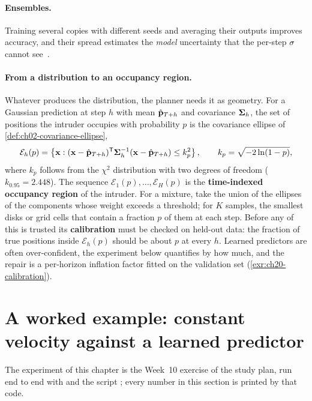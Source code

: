\paragraph{Ensembles.}%
Training several copies with different seeds and averaging their outputs
improves accuracy, and their spread estimates the \emph{model} uncertainty
that the per-step $\mathbf{\sigma}$ cannot
see~\cite{lakshminarayanan2017ensembles}.

\paragraph{From a distribution to an occupancy region.}
%
Whatever produces the distribution, the planner needs it as geometry. For a
Gaussian prediction at step $h$ with mean $\hat{\mathbf{p}}_{T+h}$ and covariance
$\mathbf{\Sigma}_h$, the set of positions the intruder occupies with probability
$p$ is the covariance ellipse of \cref{def:ch02-covariance-ellipse},
\begin{equation}
  \mathcal{E}_h(p) = \left\{ \mathbf{x} : (\mathbf{x} - \hat{\mathbf{p}}_{T+h})^{\mathsf{T}}\mathbf{\Sigma}_h^{-1}(\mathbf{x} - \hat{\mathbf{p}}_{T+h}) \le k_p^2 \right\},
  \qquad k_p = \sqrt{-2\ln(1 - p)},
  \label{eq:ch20-ellipse}
\end{equation}
where $k_p$ follows from the $\chi^2$ distribution with two degrees of
freedom ($k_{0.95} = 2.448$). The sequence $\mathcal{E}_1(p), \dots,
\mathcal{E}_H(p)$ is the \textbf{time-indexed occupancy region} of the
intruder. For a mixture, take the union of the ellipses of the components
whose weight exceeds a threshold; for $K$ samples, the smallest disks or grid
cells that contain a fraction $p$ of them at each step. Before any of this is
trusted its \textbf{calibration} must be checked on
held-out data: the fraction of true positions inside $\mathcal{E}_h(p)$ should
be about $p$ at every $h$. Learned predictors are often over-confident, the
experiment below quantifies by how much, and the repair is a per-horizon
inflation factor fitted on the validation set
(\cref{exr:ch20-calibration}).

\section[A worked example]{A worked example: constant velocity against a learned predictor}
\label{sec:ch20-example}

The experiment of this chapter is the Week~10 exercise of the study plan,
run end to end with  and the script
; every number in this section is printed by that
code.

